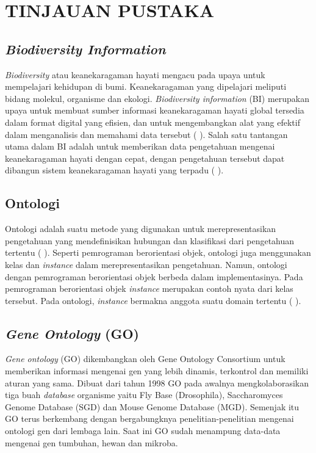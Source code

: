 \section*{TINJAUAN PUSTAKA}

\subsection*{\textit{Biodiversity Information}}

\textit{Biodiversity} atau keanekaragaman hayati mengacu pada upaya untuk mempelajari kehidupan di bumi. Keanekaragaman yang dipelajari meliputi bidang molekul, organisme dan ekologi. \textit{Biodiversity information} (BI) merupakan upaya untuk membuat sumber informasi keanekaragaman hayati global tersedia dalam format digital yang efisien, dan untuk mengembangkan alat yang efektif dalam menganalisis dan memahami data tersebut (\citeauthor{GILLMANE2009} \cite*{GILLMANE2009}).  Salah satu tantangan utama dalam BI adalah untuk memberikan data pengetahuan mengenai keanekaragaman hayati dengan cepat, dengan pengetahuan tersebut dapat dibangun sistem keanekaragaman hayati yang terpadu (\citeauthor{GILLMANE2009} \cite*{GILLMANE2009}).

\subsection*{Ontologi}

Ontologi adalah suatu metode yang digunakan untuk merepresentasikan pengetahuan yang mendefinisikan hubungan dan klasifikasi dari pengetahuan tertentu (\citeauthor{JEPSEN2010} \cite*{JEPSEN2010}). Seperti pemrograman berorientasi objek, ontologi juga menggunakan kelas dan \textit{instance} dalam merepresentasikan pengetahuan. Namun, ontologi dengan pemrograman berorientasi objek berbeda dalam implementasinya. Pada pemrograman berorientasi objek \textit{instance} merupakan contoh nyata dari kelas tersebut. Pada ontologi, \textit{instance} bermakna anggota suatu domain tertentu (\citeauthor{JEPSEN2010} \cite*{JEPSEN2010}).

\subsection*{\textit{Gene Ontology} (GO)}

\textit{Gene ontology} (GO) dikembangkan oleh Gene Ontology Consortium untuk memberikan informasi mengenai gen yang lebih dinamis, terkontrol dan memiliki aturan yang sama. Dibuat dari tahun 1998 GO pada awalnya mengkolaborasikan tiga buah \textit{database} organisme yaitu Fly Base (Drosophila), Saccharomyces Genome Database (SGD) dan Mouse Genome Database (MGD). Semenjak itu GO terus berkembang dengan bergabungknya penelitian-penelitian mengenai ontologi gen dari lembaga lain. Saat ini GO sudah menampung data-data mengenai gen tumbuhan, hewan dan mikroba. 

